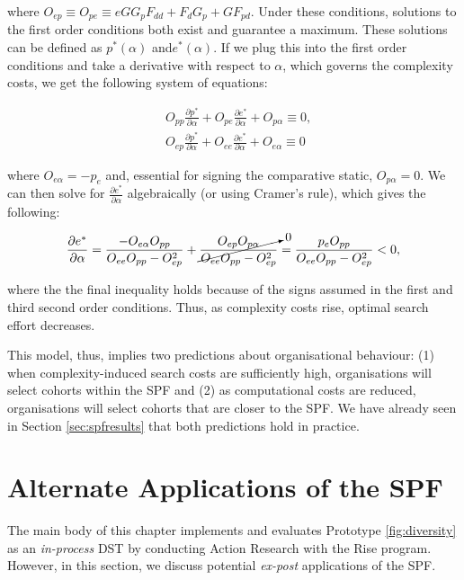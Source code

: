 \noindent where $O_{ep} \equiv O_{pe} \equiv eGG_pF_{dd} + F_dG_p + GF_{pd}$. Under these conditions, solutions to the first order conditions both exist and guarantee a maximum. These solutions can be defined as $p^*(\alpha)$ and$e^*(\alpha)$. If we plug this into the first order conditions and take a derivative with respect to $\alpha$, which governs the complexity costs, we get the following system of equations:

\begin{align}
& O_{pp}\frac{\partial p^*}{\partial \alpha} + O_{pe}\frac{\partial e^*}{\partial \alpha} + O_{p\alpha} \equiv 0, \nonumber \\
& O_{ep}\frac{\partial p^*}{\partial \alpha} + O_{ee}\frac{\partial e^*}{\partial \alpha} + O_{e\alpha} \equiv 0  \nonumber
\end{align}

\noindent where $O_{e\alpha} = -p_e$ and, essential for signing the comparative static, $O_{p\alpha} = 0$. We can then solve for $\frac{\partial e^*}{\partial \alpha}$ algebraically (or using Cramer's rule), which gives the following:

\begin{equation}
\frac{\partial e^*}{\partial \alpha} = \frac{-O_{e\alpha}O_{pp}}{O_{ee}O_{pp} - O_{ep}^2} + \cancelto{0}{\frac{O_{ep}O_{p\alpha}}{O_{ee}O_{pp} - O_{ep}^2}} = \frac{p_eO_{pp}}{O_{ee}O_{pp} - O_{ep}^2} < 0, \label{eq:comp_stat}
\end{equation}

\noindent where the the final inequality holds because of the signs assumed in the first and third second order conditions. Thus, as complexity costs rise, optimal search effort decreases.

This model, thus, implies two predictions about organisational behaviour: (1) when complexity-induced search costs are sufficiently high, organisations will select cohorts within the SPF and (2) as computational costs are reduced, organisations will select cohorts that are closer to the SPF. We have already seen in Section \ref{sec:spfresults} that both predictions hold in practice.

\section{Alternate Applications of the SPF}\label{sec:spfapplications}
The main body of this chapter implements and evaluates Prototype \ref{fig:diversity} as an \emph{in-process} DST by conducting Action Research with the Rise program. However, in this section, we discuss potential \emph{ex-post} applications of the SPF.

